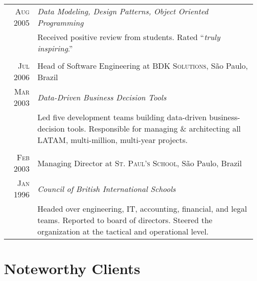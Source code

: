 \documentclass[a4paper,10pt]{article}
\begin{document}
\begin{tabular}{r|p{14cm}}
  \textsc{Aug 2005} & \emph{Data Modeling, Design Patterns, Object Oriented
    Programming} \\

  &\footnotesize{Received positive review from students. Rated ``\emph{truly
      inspiring}.''}\\

  \multicolumn{2}{c}{}\\

  \textsc{Jul 2006} & Head of Software Engineering at \textsc{BDK
    Solutions}, S\~{a}o Paulo, Brazil \\

  \textsc{Mar 2003} & \emph{Data-Driven Business Decision Tools} \\

  &\footnotesize{Led five development teams building data-driven
    business-decision tools. Responsible for managing \& architecting
    all LATAM, multi-million, multi-year projects.}\\

  \multicolumn{2}{c}{}\\

  \textsc{Feb 2003} & Managing Director at \textsc{St. Paul's School}, S\~{a}o
  Paulo, Brazil \\

  \textsc{Jan 1996} & \emph{Council of British International Schools} \\

  &\footnotesize{Headed over engineering, IT, accounting, financial, and legal
    teams. Reported to board of directors. Steered the organization at the
    tactical and operational level.}\\

\end{tabular}

\section{Noteworthy Clients}
\end{document}
